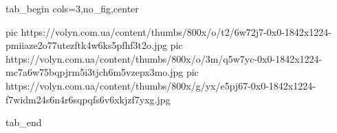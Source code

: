  
 
 
 
 


\ifcmt
  tab_begin cols=3,no_fig,center

     pic https://volyn.com.ua/content/thumbs/800x/o/t2/6w72j7-0x0-1842x1224-pmiiaze2o77utezftk4w6ks5pfhf3t2o.jpg
		 pic https://volyn.com.ua/content/thumbs/800x/o/3m/q5w7yc-0x0-1842x1224-mc7a6w75bqpjrm5i3tjch6m5vzepx3mo.jpg
		 pic https://volyn.com.ua/content/thumbs/800x/g/yx/e5pj67-0x0-1842x1224-f7widm24s6n4r6sqpqfs6v6xkjzf7yxg.jpg

  tab_end
\fi
